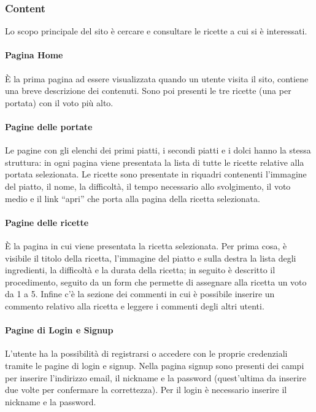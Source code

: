\subsubsection{Content}
\label{ssub:content}
Lo scopo principale del sito è cercare e consultare le ricette a cui si è interessati.

\paragraph{Pagina Home}
È la prima pagina ad essere visualizzata quando un utente visita il sito, contiene una breve descrizione dei contenuti.
Sono poi presenti le tre ricette (una per portata) con il voto più alto.

\paragraph{Pagine delle portate}
Le pagine con gli elenchi dei primi piatti, i secondi piatti e i dolci hanno la stessa struttura: in ogni pagina viene presentata la lista di tutte le ricette relative alla portata selezionata. Le ricette sono presentate in riquadri contenenti l'immagine del piatto, il nome, la difficoltà, il tempo necessario allo svolgimento, il voto medio e il link ``apri'' che porta alla pagina della ricetta selezionata.

\paragraph{Pagine delle ricette}
È la pagina in cui viene presentata la ricetta selezionata. Per prima cosa, è visibile il titolo della ricetta, l'immagine del piatto e sulla destra la lista degli ingredienti, la difficoltà e la durata della ricetta; in seguito è descritto il procedimento, seguito da un form che permette di assegnare alla ricetta un voto da 1 a 5. Infine c'è la sezione dei commenti in cui è possibile inserire un commento relativo alla ricetta e leggere i commenti degli altri utenti.

\paragraph{Pagine di Login e Signup}
L'utente ha la possibilità di registrarsi o accedere con le proprie credenziali tramite le pagine di login e signup. Nella pagina signup sono presenti dei campi per inserire l'indirizzo email, il nickname e la password (quest'ultima da inserire due volte per confermare la correttezza). Per il login è necessario inserire  il nickname e la password.

